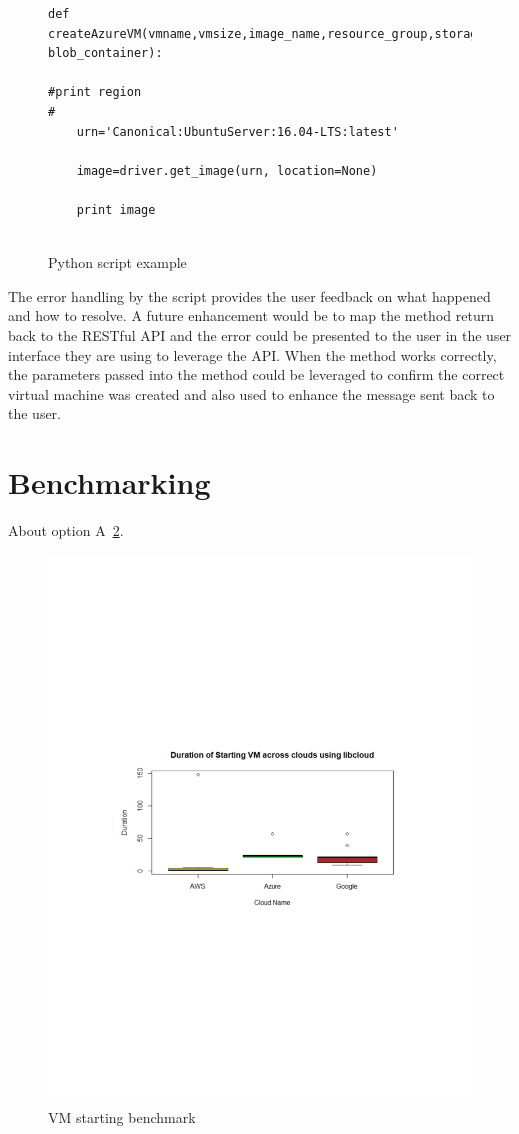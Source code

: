\begin{figure}[htb]
\begin{verbatim}
def
createAzureVM(vmname,vmsize,image_name,resource_group,storage_account,nw_intf,
blob_container): 

#print region
#
	urn='Canonical:UbuntuServer:16.04-LTS:latest'

	image=driver.get_image(urn, location=None)

	print image
	
\end{verbatim}

\caption{Python script example}\label{c:Python-example}
\end{figure}	

The error handling by the script provides the user feedback on what happened
and
how to resolve. A future enhancement would be to map the method return back to
the RESTful API and the error could be presented to the user in the user
interface they are using to leverage the API. When the method works correctly,
the parameters passed into the method could be leveraged to confirm the correct
virtual machine was created and also used to enhance the message sent back to
the user.

\section{Benchmarking}

About option A~\ref{F:vm-start}.

\begin{figure}[!ht]
  \centering
  \includegraphics[width=\columnwidth]{images/StartVM.pdf}
  \caption{VM starting benchmark}\label{F:vm-start}
\end{figure}

